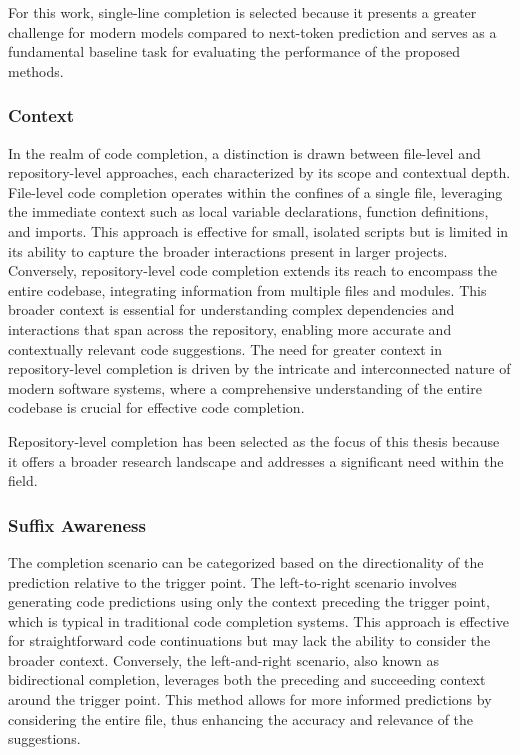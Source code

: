 For this work, single-line completion is selected because it presents a greater challenge for modern models compared to next-token prediction and serves as a fundamental baseline task for evaluating the performance of the proposed methods.

\subsubsection*{Context}

In the realm of code completion, a distinction is drawn between file-level and repository-level approaches, each characterized by its scope and contextual depth. File-level code completion operates within the confines of a single file, leveraging the immediate context such as local variable declarations, function definitions, and imports. This approach is effective for small, isolated scripts but is limited in its ability to capture the broader interactions present in larger projects. Conversely, repository-level code completion extends its reach to encompass the entire codebase, integrating information from multiple files and modules. This broader context is essential for understanding complex dependencies and interactions that span across the repository, enabling more accurate and contextually relevant code suggestions. The need for greater context in repository-level completion is driven by the intricate and interconnected nature of modern software systems, where a comprehensive understanding of the entire codebase is crucial for effective code completion.

Repository-level completion has been selected as the focus of this thesis because it offers a broader research landscape and addresses a significant need within the field.

\subsubsection*{Suffix Awareness}

The completion scenario can be categorized based on the directionality of the prediction relative to the trigger point. The left-to-right scenario involves generating code predictions using only the context preceding the trigger point, which is typical in traditional code completion systems. This approach is effective for straightforward code continuations but may lack the ability to consider the broader context. Conversely, the left-and-right scenario, also known as bidirectional completion, leverages both the preceding and succeeding context around the trigger point. This method allows for more informed predictions by considering the entire file, thus enhancing the accuracy and relevance of the suggestions.

